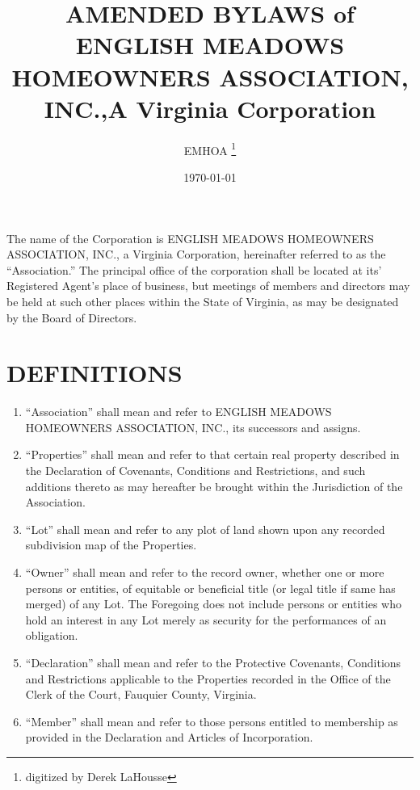 \documentclass[10pt, letterpaper]{article}
\title{AMENDED BYLAWS of ENGLISH MEADOWS HOMEOWNERS ASSOCIATION, INC.,\linebreak[0] A Virginia Corporation}
\author{EMHOA \thanks{digitized by Derek LaHousse}}
\date{\today}
\begin{document}
\maketitle

\tableofcontents

\section{}
The name of the Corporation is ENGLISH MEADOWS HOMEOWNERS ASSOCIATION, INC., a Virginia Corporation, hereinafter referred to as the ``Association.''
The principal office of the corporation shall be located at its' Registered Agent's place of business, but meetings of members and directors may be held at such other places within the State of Virginia, as may be designated by the Board of Directors.

\section{DEFINITIONS}
\begin{enumerate}
  \item ``Association'' shall mean and refer to ENGLISH MEADOWS HOMEOWNERS ASSOCIATION, INC., its successors and assigns.
  \item ``Properties'' shall mean and refer to that certain real property described in the Declaration of Covenants, Conditions and Restrictions, and such additions thereto as may hereafter be brought within the Jurisdiction of the Association.
  \item ``Lot'' shall mean and refer to any plot of land shown upon any recorded subdivision map of the Properties.
  \item ``Owner'' shall mean and refer to the record owner, whether one or more persons or entities, of equitable or beneficial title (or legal title if same has merged) of any Lot.
    The Foregoing does not include persons or entities who hold an interest in any Lot merely as security for the performances of an obligation.
  \item ``Declaration'' shall mean and refer to the Protective Covenants, Conditions and Restrictions applicable to the Properties recorded in the Office of the Clerk of the Court, Fauquier County, Virginia.
  \item ``Member'' shall mean and refer to those persons entitled to membership as provided in the Declaration and Articles of Incorporation.
\end{enumerate}
\end{document}
